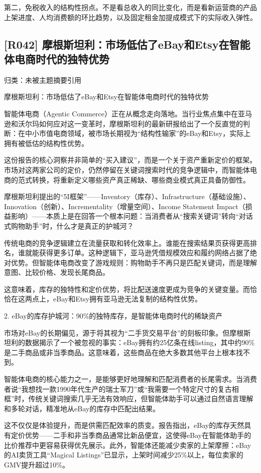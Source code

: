 \documentclass[11pt]{ctexart}
\begin{document}
第二，免税收入的结构性拐点。不是看总收入的同比变化，而是看新运营商的产品上架进度、人均消费额的环比趋势，以及固定租金加提成模式下的实际收入弹性。

\subsection{[R042] 摩根斯坦利：市场低估了eBay和Etsy在智能体电商时代的独特优势}
{\small\color{refgray}归类：未被主题摘要引用}

摩根斯坦利：市场低估了eBay和Etsy在智能体电商时代的独特优势

智能体电商（Agentic Commerce）正在从概念走向落地。当行业焦点集中在亚马逊和沃尔玛如何应对这一变革时，摩根斯坦利的最新研报给出了一个反直觉的判断：在中小市值电商领域，被市场长期视为“结构性输家”的eBay和Etsy，实际上拥有被低估的结构性优势。

这份报告的核心洞察并非简单的“买入建议”，而是一个关于资产重新定价的框架。市场对这两家公司的定价，仍然停留在关键词搜索时代的竞争逻辑中，而智能体电商的范式转换，将重新定义哪些资产真正稀缺、哪些商业模式真正具备防御性。

摩根斯坦利提出的“5I框架”——Inventory（库存）、Infrastructure（基础设施）、Innovation（创新）、Incrementality（增量空间）、Income Statement Impact（损益影响）——本质上是在回答一个根本问题：当消费者从“搜索关键词”转向“对话式购物助手”时，什么才是真正的护城河？

传统电商的竞争逻辑建立在流量获取和转化效率上。谁能在搜索结果页获得更高排名，谁就能获得更多订单。这种逻辑下，亚马逊凭借规模效应和履约网络占据了绝对优势。但智能体电商改变了游戏规则：购物助手不再只是匹配关键词，而是理解意图、比较价格、发现长尾商品。

这意味着，库存的独特性和定价优势，将比配送速度更成为竞争的关键变量。而恰恰在这两点上，eBay和Etsy拥有亚马逊无法复制的结构性优势。

2. eBay的库存护城河：90\%的独特库存，是智能体电商时代的稀缺资产

市场对eBay的长期偏见，源于将其视为“二手货交易平台”的刻板印象。但摩根斯坦利的数据揭示了一个被忽视的事实：eBay拥有约25亿条在线listing，其中约90\%是二手商品或非当季商品。这意味着，这些商品在绝大多数其他平台上根本找不到。

智能体电商的核心能力之一，是能够更好地理解和匹配消费者的长尾需求。当消费者说“我想找一款1990年代生产的瑞士军刀”或“我需要一个特定尺寸的复古相框”时，传统关键词搜索几乎无法有效响应，但智能体助手可以通过自然语言理解和多轮对话，精准地从eBay的库存中匹配出结果。

这不仅仅是体验提升，而是供需匹配效率的质变。报告指出，eBay的库存天然具有定价优势——二手和非当季商品通常比新品便宜，这使得eBay在智能体助手的比价推荐中更容易获得优先展示。此外，智能体还能减少卖家的上架摩擦：eBay的AI卖货工具“Magical Listings”已显示，上架时间减少25\%以上，每位卖家的GMV提升超过10\%。
\end{document}

